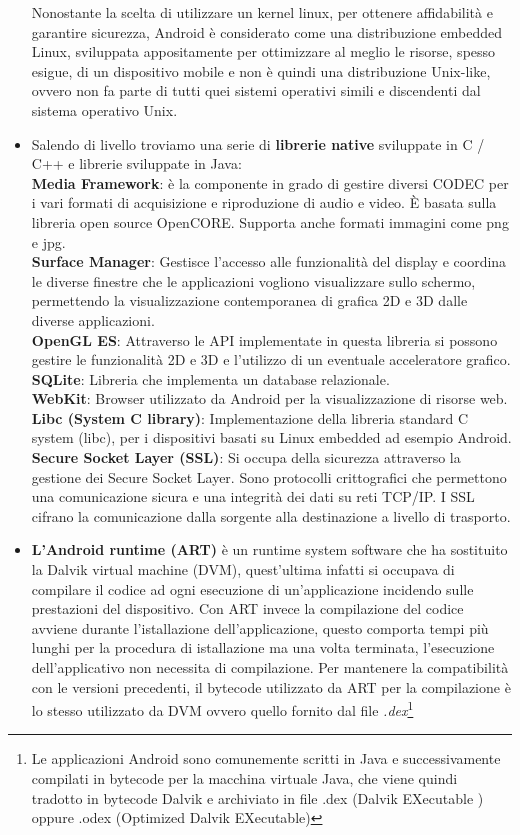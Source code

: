 \begin{itemize}
Nonostante la scelta di utilizzare un kernel linux, per ottenere affidabilità e garantire sicurezza, Android è considerato come una distribuzione embedded Linux, sviluppata appositamente per ottimizzare al meglio le risorse, spesso esigue, di un dispositivo mobile e non è quindi una distribuzione Unix-like, ovvero non fa parte di tutti quei sistemi operativi simili e discendenti dal sistema operativo Unix. 
\item Salendo di livello troviamo una serie di \textbf{librerie native} sviluppate in C / C++ e librerie sviluppate in Java: 
\\\textbf{Media Framework}: è la componente in grado di gestire diversi CODEC per i vari formati di acquisizione e riproduzione di audio e video. È basata sulla libreria open source OpenCORE. Supporta anche formati immagini come png e jpg. 
\\\textbf{Surface Manager}: Gestisce l’accesso alle funzionalità del display e coordina le diverse finestre che le applicazioni vogliono visualizzare sullo schermo, permettendo la visualizzazione contemporanea di grafica 2D e 3D dalle diverse applicazioni.
\\\textbf{OpenGL ES}: Attraverso le API implementate in questa libreria si possono gestire le funzionalità 2D e 3D e l'utilizzo di un eventuale acceleratore grafico. 
\\\textbf{SQLite}: Libreria che implementa un database relazionale.
\\\textbf{WebKit}: Browser utilizzato da Android per la visualizzazione di risorse web. 
\\\textbf{Libc (System C library)}: Implementazione della libreria standard C system (libc), per i dispositivi basati su Linux embedded ad esempio Android.
\\\textbf{Secure Socket Layer (SSL)}: Si occupa della sicurezza attraverso la gestione dei Secure Socket Layer. Sono protocolli crittografici che permettono una comunicazione sicura e una integrità dei dati su reti TCP/IP. I SSL cifrano la comunicazione dalla sorgente alla destinazione a livello di trasporto.
\item \textbf{L'Android runtime (ART)} è un runtime system software che ha sostituito la Dalvik virtual machine (DVM), quest'ultima infatti si occupava di compilare il codice ad ogni esecuzione di un'applicazione incidendo sulle prestazioni del dispositivo. Con ART invece la compilazione del codice avviene durante l'istallazione dell'applicazione, questo comporta tempi più lunghi per la procedura di istallazione ma una volta terminata, l'esecuzione dell'applicativo non necessita di compilazione. Per mantenere la compatibilità con le versioni precedenti, il bytecode utilizzato da ART per la compilazione è lo stesso utilizzato da DVM ovvero quello fornito dal file \textit{.dex}\footnote{Le applicazioni Android sono comunemente scritti in Java e successivamente compilati in bytecode per la macchina virtuale Java, che viene quindi tradotto in bytecode Dalvik e archiviato in file .dex (Dalvik EXecutable ) oppure .odex (Optimized Dalvik EXecutable)}

\end{itemize}
